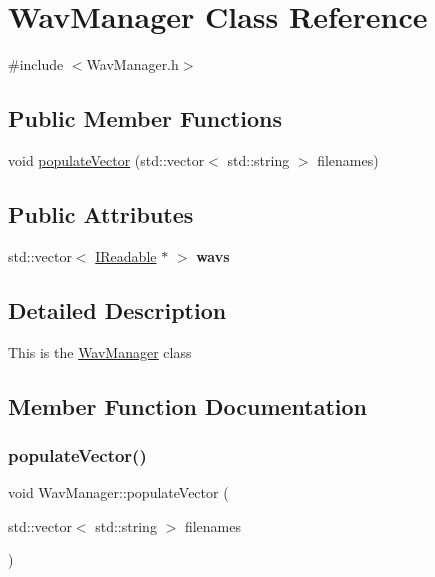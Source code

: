 \hypertarget{classWavManager}{}\section{Wav\+Manager Class Reference}
\label{classWavManager}


{\ttfamily \#include $<$Wav\+Manager.\+h$>$}

\subsection*{Public Member Functions}
\begin{DoxyCompactItemize}
\item 
void \hyperlink{classWavManager_ad777fbcc1b1fb7185c66d69a66842e02}{populate\+Vector} (std\+::vector$<$ std\+::string $>$ filenames)
\end{DoxyCompactItemize}
\subsection*{Public Attributes}
\begin{DoxyCompactItemize}
\item 
\mbox{\label{classWavManager_aa12134771083da849053d1d5a6372d65}} 
std\+::vector$<$ \hyperlink{classIReadable}{I\+Readable} $\ast$ $>$ {\bfseries wavs}
\end{DoxyCompactItemize}


\subsection{Detailed Description}
This is the \hyperlink{classWavManager}{Wav\+Manager} class 

\subsection{Member Function Documentation}
\mbox{\label{classWavManager_ad777fbcc1b1fb7185c66d69a66842e02}} 
\subsubsection{\texorpdfstring{populate\+Vector()}{populateVector()}}
{\footnotesize\ttfamily void Wav\+Manager\+::populate\+Vector (\begin{DoxyParamCaption}\item[{std\+::vector$<$ std\+::string $>$}]{filenames }\end{DoxyParamCaption})}

